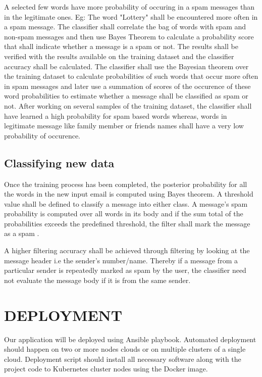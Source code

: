\documentclass[9pt,twocolumn,twoside]{../../styles/osajnl}
\begin{document}
A selected few words have more probability of occuring in a spam
messages than in the legitimate ones. Eg: The word "Lottery" shall be
encountered more often in a spam message.  The classifier shall
correlate the bag of words with spam and non-spam messages and then
use Bayes Theorem to calculate a probability score that shall indicate
whether a message is a spam or not. The results shall be verified with
the results available on the training dataset and the classifier
accuracy shall be calculated.  The classifier shall use the Bayesian
theorem over the training dataset to calculate probabilities of such
words that occur more often in spam messages and later use a summation
of scores of the occurence of these word probabilities to estimate
whether a message shall be classified as spam or not. After working on
several samples of the training dataset, the classifier shall have
learned a high probability for spam based words whereas, words in
legitimate message like family member or friends names shall have a
very low probability of occurence.

\subsection{Classifying new data}

Once the training process has been completed, the posterior
probability for all the words in the new input email is computed using
Bayes theorem. A threshold value shall be defined to classify a
message into either class. A message's spam probability is computed
over all words in its body and if the sum total of the probabilities
exceeds the predefined threshold, the filter shall mark the message as
a spam \cite{www-wiki-naivebayes}.

A higher filtering accuracy shall be achieved through filtering by
looking at the message header i.e the sender's number/name. Thereby if
a message from a particular sender is repeatedly marked as spam by the
user, the classifier need not evaluate the message body if it is from
the same sender.

\section{DEPLOYMENT}
Our application will be deployed using Ansible \cite{www-ansible}
playbook. Automated deployment should happen on two or more nodes
clouds or on multiple clusters of a single cloud. Deployment script
should install all necessary software along with the project code to
Kubernetes cluster nodes using the Docker image.
\end{document}
